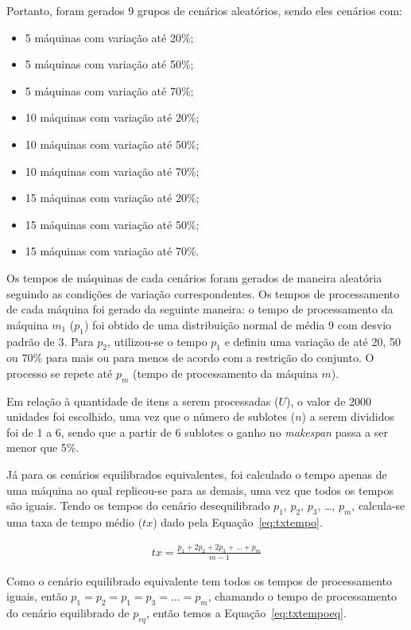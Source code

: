     Portanto, foram gerados 9 grupos de cenários aleatórios, sendo eles cenários com:
    \begin{itemize}
        \item 5 máquinas com variação até 20\%;
        \item 5 máquinas com variação até 50\%;
        \item 5 máquinas com variação até 70\%;
        \item 10 máquinas com variação até 20\%;
        \item 10 máquinas com variação até 50\%;
        \item 10 máquinas com variação até 70\%;
        \item 15 máquinas com variação até 20\%;
        \item 15 máquinas com variação até 50\%;
        \item 15 máquinas com variação até 70\%.
    \end{itemize}
    
    Os tempos de máquinas de cada cenários foram gerados de maneira aleatória seguindo as condições de variação correspondentes. Os tempos de processamento de cada máquina foi gerado da seguinte maneira: o tempo de processamento da máquina $m_1$ ($p_1$) foi obtido de uma distribuição normal de média 9 com desvio padrão de 3. Para $p_2$, utilizou-se o tempo $p_1$ e definiu uma variação de até 20, 50 ou 70\% para mais ou para menos de acordo com a restrição do conjunto. O processo se repete até $p_m$ (tempo de processamento da máquina $m$).
    
    Em relação à quantidade de itens a serem processadas ($U$), o valor de 2000 unidades foi escolhido, uma vez que o número de sublotes ($n$) a serem divididos foi de 1 a 6, sendo que a partir de 6 sublotes o ganho no \textit{makespan} passa a ser menor que 5\%. 
    
    Já para os cenários equilibrados equivalentes, foi calculado o tempo apenas de uma máquina ao qual replicou-se para as demais, uma vez que todos os tempos são iguais. Tendo os tempos do cenário desequilibrado $p_1$, $p_2$, $p_3$, \ldots, $p_m$, calcula-se uma taxa de tempo médio ($tx$) dado pela Equação~\ref{eq:txtempo}.
    
    \begin{eqnarray}
        tx = \frac{p_1+2p_2+2p_3+\ldots+p_m}{m-1}
        \label{eq:txtempo}
    \end{eqnarray}
    
    Como o cenário equilibrado equivalente tem todos os tempos de processamento iguais, então $p_1=p_2=p_1=p_3=\ldots=p_m$, chamando o tempo de processamento do cenário equilibrado de $p_{eq}$, então temos a Equação~\ref{eq:txtempoeq}.
    
